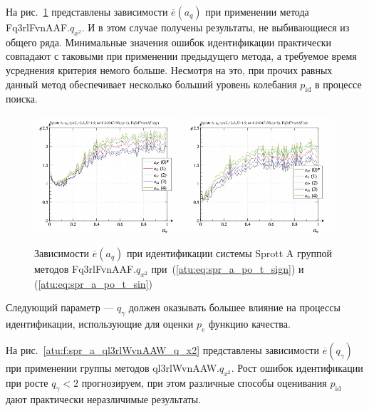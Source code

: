 На рис.~\ref{atu:f:spr_a_a_q_Fq3rlFvnAAF_q_x2} представлены зависимости
$\overline{e}(a_q)$ при применении метода Fq3rlFvnAAF.$q_{x^2}$.
И в этом случае получены результаты, не выбивающиеся из общего ряда.
Минимальные значения ошибок идентификации практически совпадают
с таковыми при применении предыдущего метода, а требуемое
время усреднения критерия немого больше. Несмотря на это,
при прочих равных данный метод обеспечивает несколько больший уровень колебания $p_\mathrm{id}$
в процессе поиска.


\begin{figure}[htb!]
  \centerline{
    \includegraphics[width=0.49\textwidth]{p/cha/spr_a/Fq3rlFvnAAF_x2/sprott_a_id-p_a_q_sign.png}
    \hfill
    \includegraphics[width=0.49\textwidth]{p/cha/spr_a/Fq3rlFvnAAF_x2/sprott_a_id-p_a_q_sin.png}
  }
  \caption{Зависимости $\overline{e}(a_q)$ при идентификации системы Sprott A группой методов Fq3rlFvnAAF.$q_{x^2}$
   при~(\ref{atu:eq:spr_a_po_t_sign}) и (\ref{atu:eq:spr_a_po_t_sin})}
  \label{atu:f:spr_a_a_q_Fq3rlFvnAAF_q_x2}
\end{figure}

Следующий параметр --- $q_\gamma$ должен оказывать большее влияние на процессы идентификации,
использующие для оценки $p_e$ функцию качества.

На рис.~\ref{atu:f:spr_a_ql3rlWvnAAW_q_x2} представлены зависимости
$\overline{e}(q_\gamma)$ при применении группы методов ql3rlWvnAAW.$q_{x^2}$.
Рост ошибок идентификации при росте $q_\gamma < 2$
прогнозируем, при этом различные способы оценивания $p_\mathrm{id}$
дают практически неразличимые результаты.

